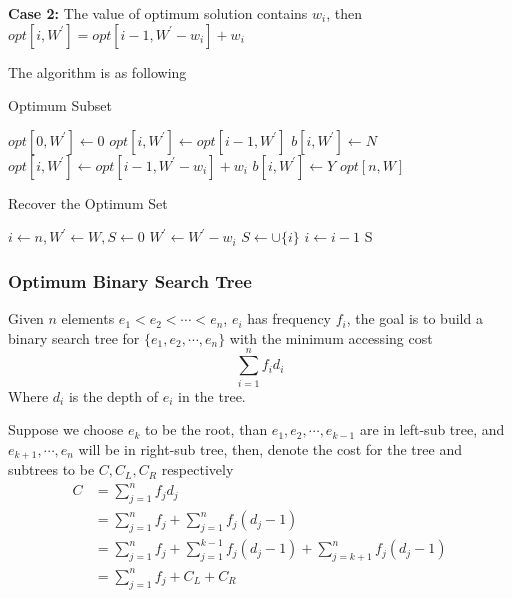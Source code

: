 					\textbf{Case 2: }The value of optimum solution contains $w_i$, then $opt[i, W^\prime] = opt[i - 1, W^\prime - w_i] + w_i$

					The algorithm is as following
					\begin{algorithm}[h]
						\caption{Optimum Subset}
						\begin{algorithmic}[1]
								\State $opt[0, W^\prime] \gets 0$
							\EndFor
									\State $opt[i, W^\prime] \gets opt[i - 1, W^\prime]$
									\State $b[i, W^\prime] \gets N$
										\State $opt[i, W^\prime] \gets opt[i - 1, W^\prime - w_i] + w_i$
										\State $b[i, W^\prime] \gets Y$
									\EndIf
								\EndFor
							\EndFor
							\State \Return $opt[n, W]$
						\end{algorithmic}
					\end{algorithm}

					\begin{algorithm}[h]
						\caption{Recover the Optimum Set}
						\begin{algorithmic}[1]
							\State $i \gets n, W^\prime \gets W, S \gets 0$
									\State $W^\prime \gets W^\prime - w_i$
									\State $S \gets \cup \{i\}$
								\EndIf
								\State $i \gets i - 1$
							\EndWhile
							\State \Return S
						\end{algorithmic}
					\end{algorithm}

				\subsubsection{Optimum Binary Search Tree}
					Given $n$ elements $e_1 < e_2 < \cdots < e_n$, $e_i$ has frequency $f_i$, the goal is to build a binary search tree for $\{e_1, e_2, \cdots, e_n\}$ with the minimum accessing cost
					\begin{equation}
						\sum_{i = 1}^n f_i d_i
					\end{equation}
					Where $d_i$ is the depth of $e_i$ in the tree.

					Suppose we choose $e_k$ to be the root, than $e_1, e_2, \cdots, e_{k-1}$ are in left-sub tree, and $e_{k+1}, \cdots, e_n$ will be in right-sub tree, then, denote the cost for the tree and subtrees to be $C, C_L, C_R$ respectively
					\begin{align}
						C &= \sum_{j = 1}^n f_j d_j\\
						&= \sum_{j = 1}^n f_j + \sum_{j = 1}^n f_j(d_j - 1)\\
						&= \sum_{j = 1}^n f_j + \sum_{j = 1}^{k - 1} f_j(d_j - 1) + \sum_{j = k + 1}^n f_j(d_j - 1)\\
						&= \sum_{j = 1}^n f_j + C_L + C_R
					\end{align}

